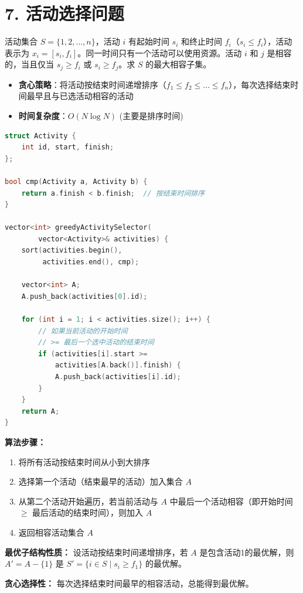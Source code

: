 \section*{7. 活动选择问题}

活动集合 $S=\{1,2,\ldots,n\}$，活动 $i$ 有起始时间 $s_i$ 和终止时间 $f_i$（$s_i \le f_i$），活动表示为 $x_i=[s_i, f_i]$。同一时间只有一个活动可以使用资源。活动 $i$ 和 $j$ 是相容的，当且仅当 $s_j \ge f_i$ 或 $s_i \ge f_j$。求 $S$ 的最大相容子集。

\begin{itemize}
    \item \textbf{贪心策略}：将活动按结束时间递增排序（$f_1 \le f_2 \le \ldots \le f_n$），每次选择结束时间最早且与已选活动相容的活动
    \item \textbf{时间复杂度}：$O(N \log N)$ (主要是排序时间)
\end{itemize}

\begin{lstlisting}[language=C++, style=cppstyle]
struct Activity {
    int id, start, finish;
};

bool cmp(Activity a, Activity b) {
    return a.finish < b.finish;  // 按结束时间排序
}

vector<int> greedyActivitySelector(
        vector<Activity>& activities) {
    sort(activities.begin(),
         activities.end(), cmp);

    vector<int> A;
    A.push_back(activities[0].id);

    for (int i = 1; i < activities.size(); i++) {
        // 如果当前活动的开始时间
        // >= 最后一个选中活动的结束时间
        if (activities[i].start >=
            activities[A.back()].finish) {
            A.push_back(activities[i].id);
        }
    }
    return A;
}
\end{lstlisting}

\textbf{算法步骤：}
\begin{enumerate}
    \item 将所有活动按结束时间从小到大排序
    \item 选择第一个活动（结束最早的活动）加入集合 $A$
    \item 从第二个活动开始遍历，若当前活动与 $A$ 中最后一个活动相容（即开始时间 $\ge$ 最后活动的结束时间），则加入 $A$
    \item 返回相容活动集合 $A$
\end{enumerate}

\textbf{最优子结构性质：} 设活动按结束时间递增排序，若 $A$ 是包含活动1的最优解，则 $A' = A - \{1\}$ 是 $S' = \{i \in S \mid s_i \ge f_1\}$ 的最优解。

\textbf{贪心选择性：} 每次选择结束时间最早的相容活动，总能得到最优解。
